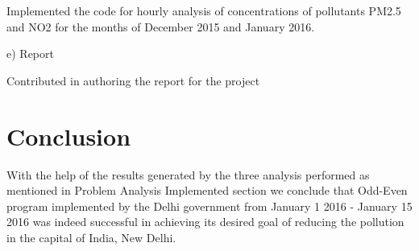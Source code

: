 \documentclass{report}
\begin{document}
   Implemented the code for hourly analysis of concentrations of pollutants PM2.5 and NO2 for the months of December 2015 and January 2016.
   
e) Report

   Contributed in authoring the report for the project

\section{Conclusion}

With the help of the results generated by the three analysis performed as mentioned in Problem Analysis Implemented section we conclude that Odd-Even program implemented by the Delhi government from January 1 2016 - January 15 2016 was indeed successful in achieving its desired goal of reducing the pollution in the capital of India, New Delhi. 




\end{document}
